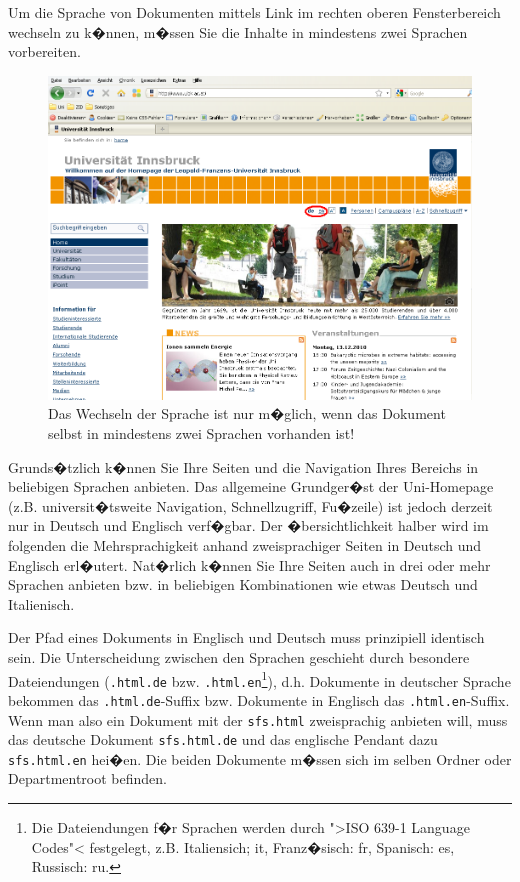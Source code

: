 Um die Sprache von Dokumenten mittels Link im rechten oberen Fensterbereich
wechseln zu k�nnen, m�ssen Sie die Inhalte in 
mindestens zwei Sprachen vorbereiten.

\begin{figure}[!ht]
	\centering
		\includegraphics[width=\textwidth]{./images/sprachewechseln.png}
	\caption{Das Wechseln der Sprache ist nur m�glich, wenn das Dokument selbst in 
mindestens zwei Sprachen vorhanden ist!}
	\label{fig:sprachewechseln}
\end{figure}

Grunds�tzlich k�nnen Sie Ihre Seiten und die Navigation Ihres Bereichs in beliebigen Sprachen anbieten. Das allgemeine Grundger�st der Uni-Homepage (z.B. universit�tsweite Navigation, Schnellzugriff, Fu�zeile) ist jedoch derzeit nur in Deutsch und Englisch verf�gbar.
Der �bersichtlichkeit halber wird im folgenden die Mehrsprachigkeit anhand zweisprachiger Seiten in Deutsch und Englisch erl�utert. Nat�rlich k�nnen Sie Ihre Seiten auch in drei oder mehr Sprachen anbieten bzw. in beliebigen Kombinationen wie etwas Deutsch und Italienisch. 

Der Pfad eines Dokuments in Englisch und Deutsch muss
prinzipiell identisch sein. Die Unterscheidung zwischen den Sprachen
geschieht durch besondere Dateiendungen (\nolinkurl{.html.de} bzw.
\nolinkurl{.html.en}\footnote{Die Dateiendungen f�r Sprachen werden durch ">ISO 639-1 Language Codes"< festgelegt, z.B. Italiensich; it, Franz�sisch: fr, Spanisch: es, Russisch: ru.}), d.h. Dokumente in deutscher Sprache bekommen
das \nolinkurl{.html.de}-Suffix bzw. Dokumente in Englisch das
\nolinkurl{.html.en}-Suffix. Wenn man also ein Dokument mit der
 \nolinkurl{sfs.html} zweisprachig anbieten will,
muss das deutsche Dokument \nolinkurl{sfs.html.de} und das englische
Pendant dazu \nolinkurl{sfs.html.en} hei�en. Die beiden Dokumente m�ssen sich im selben Ordner oder Departmentroot befinden.


